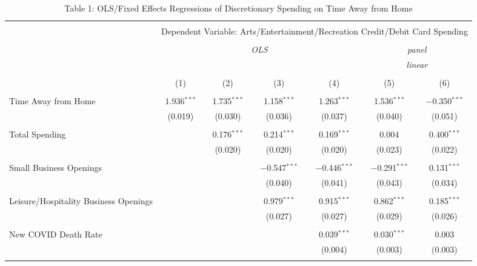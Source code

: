 
\begin{table}[!htbp] \centering 
  \caption{Table 1: OLS/Fixed Effects Regressions of Discretionary Spending on Time Away from Home} 
  \label{} 
\begin{tabular}{@{\extracolsep{5pt}}lcccccc} 
\\[-1.8ex]\hline 
\hline \\[-1.8ex] 
 & \multicolumn{6}{c}{Dependent Variable: Arts/Entertainment/Recreation Credit/Debit Card Spending} \\ 
\cline{2-7} 
\\[-1.8ex] & \multicolumn{4}{c}{\textit{OLS}} & \multicolumn{2}{c}{\textit{panel}} \\ 
 & \multicolumn{4}{c}{\textit{}} & \multicolumn{2}{c}{\textit{linear}} \\ 
\\[-1.8ex] & (1) & (2) & (3) & (4) & (5) & (6)\\ 
\hline \\[-1.8ex] 
 Time Away from Home & 1.936$^{***}$ & 1.735$^{***}$ & 1.158$^{***}$ & 1.263$^{***}$ & 1.536$^{***}$ & $-$0.350$^{***}$ \\ 
  & (0.019) & (0.030) & (0.036) & (0.037) & (0.040) & (0.051) \\ 
  & & & & & & \\ 
 Total Spending &  & 0.176$^{***}$ & 0.214$^{***}$ & 0.169$^{***}$ & 0.004 & 0.400$^{***}$ \\ 
  &  & (0.020) & (0.020) & (0.020) & (0.023) & (0.022) \\ 
  & & & & & & \\ 
 Small Business Openings &  &  & $-$0.547$^{***}$ & $-$0.446$^{***}$ & $-$0.291$^{***}$ & 0.131$^{***}$ \\ 
  &  &  & (0.040) & (0.041) & (0.043) & (0.034) \\ 
  & & & & & & \\ 
 Leisure/Hospitality Business Openings &  &  & 0.979$^{***}$ & 0.915$^{***}$ & 0.862$^{***}$ & 0.185$^{***}$ \\ 
  &  &  & (0.027) & (0.027) & (0.029) & (0.026) \\ 
  & & & & & & \\ 
 New COVID Death Rate &  &  &  & 0.039$^{***}$ & 0.030$^{***}$ & 0.003 \\ 
  &  &  &  & (0.004) & (0.003) & (0.003) \\ 
  & & & & & & \\ 

\end{tabular}
\end{table}
